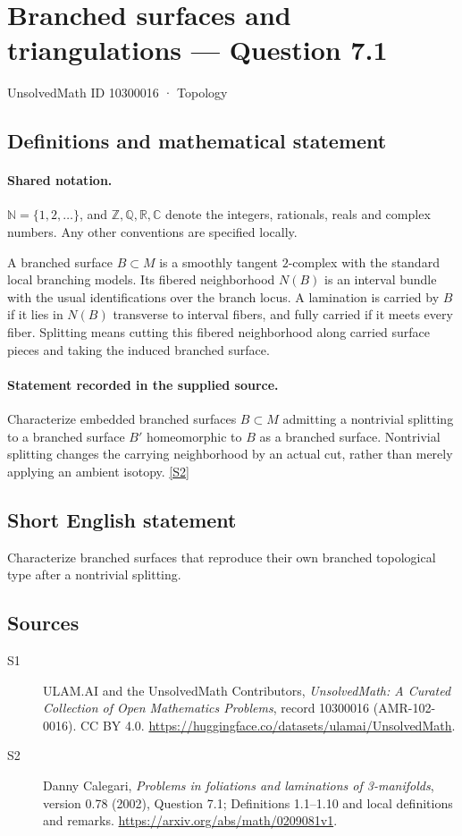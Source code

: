 \documentclass[11pt]{article}
\newcommand{\sref}[2]{\hyperlink{source:#1:#2}{[S#2]}}
\begin{document}
\setcounter{section}{10300015}
\section{Branched surfaces and triangulations — Question 7.1}\label{10300016}
{\small\sffamily UnsolvedMath ID 10300016 · Topology}
\subsection{Definitions and mathematical statement}

\paragraph{Shared notation.}$\mathbb N=\{1,2,\ldots\}$, and $\mathbb Z,\mathbb Q,\mathbb R,\mathbb C$ denote the integers, rationals, reals and complex numbers. Any other conventions are specified locally.


A branched surface $B\subset M$ is a smoothly tangent $2$-complex with the standard local branching models. Its fibered neighborhood $N(B)$ is an interval bundle with the usual identifications over the branch locus. A lamination is carried by $B$ if it lies in $N(B)$ transverse to interval fibers, and fully carried if it meets every fiber. Splitting means cutting this fibered neighborhood along carried surface pieces and taking the induced branched surface.
\paragraph{Statement recorded in the supplied source.}
Characterize embedded branched surfaces $B\subset M$ admitting a nontrivial splitting to a branched surface $B'$ homeomorphic to $B$ as a branched surface. Nontrivial splitting changes the carrying neighborhood by an actual cut, rather than merely applying an ambient isotopy. \sref{10300016}{2}
\subsection{Short English statement}
Characterize branched surfaces that reproduce their own branched topological type after a nontrivial splitting.
\subsection{Sources}
\begin{description}
\item[\hypertarget{source:10300016:1}{S1}] ULAM.AI and the UnsolvedMath Contributors, \emph{UnsolvedMath: A Curated Collection of Open Mathematics Problems}, record 10300016 (AMR-102-0016). CC BY 4.0. \url{https://huggingface.co/datasets/ulamai/UnsolvedMath}.
\item[\hypertarget{source:10300016:2}{S2}] Danny Calegari, \emph{Problems in foliations and laminations of 3-manifolds}, version 0.78 (2002), Question 7.1; Definitions 1.1--1.10 and local definitions and remarks. \url{https://arxiv.org/abs/math/0209081v1}.
\end{description}
\label{end:10300016}
\end{document}
